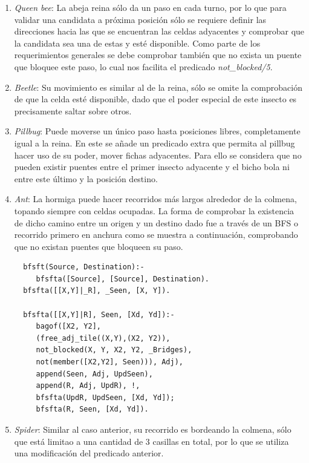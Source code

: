 \documentclass[runningheads,a4paper]{llncs}
\begin{document}
\begin{enumerate}
	\item \emph{Queen bee}: La abeja reina s\'olo da un paso en cada turno, por lo que para validar una candidata  a pr\'oxima posici\'on s\'olo se requiere definir las direcciones hacia las que se encuentran las celdas adyacentes y comprobar que la candidata sea una de estas y est\'e disponible. Como parte de los requerimientos generales se debe comprobar tambi\'en que no exista un puente que bloquee este paso, lo cual nos facilita el predicado \emph{not\_blocked/5}.
	
	\item \emph{Beetle}: Su movimiento es similar al de la reina, s\'olo se omite la comprobaci\'on de que la celda est\'e disponible, dado que el poder especial de este insecto es precisamente saltar sobre otros.
	
	\item \emph{Pillbug}: Puede moverse un \'unico paso hasta posiciones libres, completamente igual a la reina. En este se a\~nade un predicado extra que permita al pillbug hacer uso de su poder, mover fichas adyacentes. Para ello se considera que no pueden existir puentes entre el primer insecto adyacente y el bicho bola ni entre este \'ultimo y la posici\'on destino.
	
	\item \emph{Ant}: La hormiga puede hacer recorridos m\'as largos alrededor de la colmena, topando siempre con celdas ocupadas. La forma de comprobar la existencia de dicho camino entre un origen y un destino dado fue a trav\'es de un BFS o recorrido primero en anchura como se muestra a continuaci\'on, comprobando que no existan puentes que bloqueen su paso.
	
	\begin{center}
		\begin{lstlisting}
  bfsft(Source, Destination):- 
     bfsfta([Source], [Source], Destination).
  bfsfta([[X,Y]|_R], _Seen, [X, Y]).

  bfsfta([[X,Y]|R], Seen, [Xd, Yd]):- 
     bagof([X2, Y2],
     (free_adj_tile((X,Y),(X2, Y2)),
     not_blocked(X, Y, X2, Y2, _Bridges), 
     not(member([X2,Y2], Seen))), Adj),
     append(Seen, Adj, UpdSeen), 
     append(R, Adj, UpdR), !,
     bfsfta(UpdR, UpdSeen, [Xd, Yd]);
     bfsfta(R, Seen, [Xd, Yd]).
		\end{lstlisting}
	\end{center} 
	
	\item \emph{Spider}: Similar al caso anterior, su recorrido es bordeando la colmena, s\'olo que est\'a limitao a una cantidad de 3 casillas en total, por lo que se utiliza una modificaci\'on del predicado anterior.
	

\end{enumerate}
\end{document}
